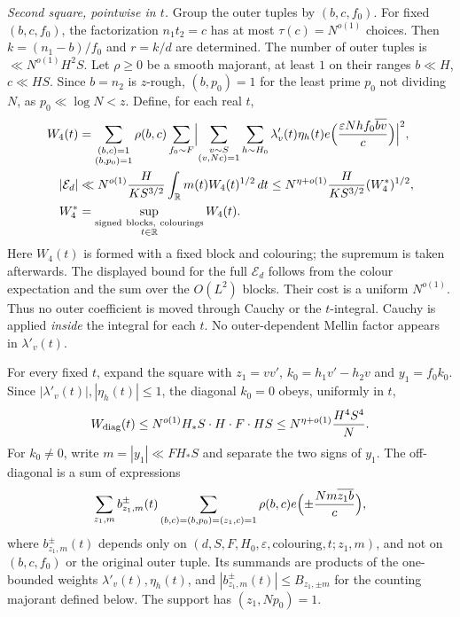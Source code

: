 \emph{Second square, pointwise in $t$.} Group the outer tuples by
$(b,c,f_0)$. For fixed $(b,c,f_0)$, the factorization $n_1t_2=c$ has at most
$\tau(c)=N^{o(1)}$ choices. Then
$k=(n_1-b)/f_0$ and $r=k/d$ are determined. The number of outer
tuples is $\ll N^{o(1)}H^2S$. Let $\rho\ge0$ be a smooth majorant,
at least $1$ on their ranges $b\ll H$, $c\ll HS$.
Since $b=n_2$ is $z$-rough, $(b,p_0)=1$ for the least prime $p_0$
not dividing $N$, as $p_0\ll\log N<z$. Define, for each real $t$,
\begin{equation}\label{sp:cs2}
\begin{aligned}
 W_4(t)&=\sum_{\substack{(b,c)=1\\(b,p_0)=1}}
 \rho(b,c)\sum_{f_0\sim F}
 \Bigl|\sum_{\substack{v\sim S\\(v,Nc)=1}}
 \sum_{h\sim H_0}\lambda'_v(t)\eta_h(t)
 e\Bigl(\frac{\varepsilon Nhf_0\overline{bv}}c\Bigr)\Bigr|^2,\\
 |\mathcal E_d|&\ll N^{o(1)}\frac{H}{KS^{3/2}}
 \int_{\mathbb R}m(t)W_4(t)^{1/2}\,dt
 \le N^{\eta+o(1)}\frac{H}{KS^{3/2}}
 (W_4^*)^{1/2},\\
 W_4^*&=\sup_{\substack{\mathrm{signed\ blocks},\ \mathrm{colourings}\\t\in\mathbb R}}W_4(t).
\end{aligned}
\end{equation}
Here $W_4(t)$ is formed with a fixed block and colouring;
the supremum is taken afterwards. The displayed bound for the full
$\mathcal E_d$ follows from the colour expectation and the sum over
the $O(L^2)$ blocks. Their cost is a uniform $N^{o(1)}$. Thus no outer
coefficient is moved through Cauchy or the $t$-integral.
Cauchy is applied \emph{inside} the integral for each $t$.
No outer-dependent Mellin factor appears in $\lambda'_v(t)$.

For every fixed $t$, expand the square with $z_1=vv'$,
$k_0=h_1v'-h_2v$ and $y_1=f_0k_0$. Since
$|\lambda'_v(t)|,|\eta_h(t)|\le1$, the diagonal $k_0=0$ obeys,
uniformly in $t$,
\begin{equation}\label{sp:diag}
 W_{\rm diag}(t)\le N^{o(1)}H_*S\cdot H\cdot F\cdot HS
 \le N^{\eta+o(1)}\frac{H^4S^4}N .
\end{equation}
For $k_0\ne0$, write $m=|y_1|\ll FH_*S$ and separate the two
signs of $y_1$. The off-diagonal is a sum of expressions
\begin{equation}\label{sp:offdiag}
 \sum_{z_1,m}b^{\pm}_{z_1,m}(t)
 \sum_{\substack{(b,c)=(b,p_0)=(z_1,c)=1}}\rho(b,c)
 e\Bigl(\pm\frac{Nm\overline{z_1b}}c\Bigr),
\end{equation}
where $b^{\pm}_{z_1,m}(t)$ depends only on
$(d,S,F,H_0,\varepsilon,\text{colouring},t;z_1,m)$, and not on
$(b,c,f_0)$ or the original outer tuple. Its summands are products
of the one-bounded weights $\lambda'_v(t),\eta_h(t)$, and
$|b^{\pm}_{z_1,m}(t)|\le B_{z_1,\pm m}$ for the counting
majorant defined below. The support has $(z_1,Np_0)=1$.

